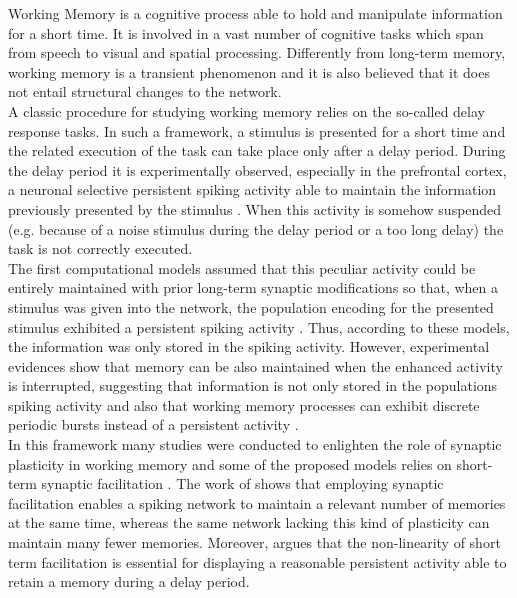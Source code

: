 \documentclass[a4paper, 12pt, twoside, openright]{book}
\begin{document}
Working Memory is a cognitive process able to hold and manipulate information for a short time. It is involved in a vast number of cognitive tasks \cite{Miller1960, baddeley_hitch1974, Cowan1998, Golosio2015} which span from speech to visual and spatial processing. Differently from long-term memory, working memory is a transient phenomenon and it is also believed that it does not entail structural changes to the network.\\
A classic procedure for studying working memory relies on the so-called delay response tasks. In such a framework, a stimulus is presented for a short time and the related execution of the task can take place only after a delay period. During the delay period it is experimentally observed, especially in the prefrontal cortex, a neuronal selective persistent spiking activity able to maintain the information previously presented by the stimulus \cite{Funahashi1989, GoldmanRakic1995, DEsposito2015}. When this activity is somehow suspended (e.g. because of a noise stimulus during the delay period or a too long delay) the task is not correctly executed.\\
The first computational models assumed that this peculiar activity could be entirely maintained with prior long-term synaptic modifications so that, when a stimulus was given into the network, the population encoding for the presented stimulus exhibited a persistent spiking activity \cite{hebb-organization-of-behavior-1949, Hopfield1982}. Thus, according to these models, the information was only stored in the spiking activity. However, experimental evidences show that memory can be also maintained when the enhanced activity is interrupted, suggesting that information is not only stored in the populations spiking activity \cite{Stokes2015} and also that working memory processes can exhibit discrete periodic bursts instead of a persistent activity \cite{Honkanen2014, Lundqvist2016}.\\
In this framework many studies were conducted to enlighten the role of synaptic plasticity in working memory \cite{Barak2014} and some of the proposed models relies on short-term synaptic facilitation \cite{barak_tsodyks2007,Mongillo2008,Rolls2013,Hansel2013}. The work of \cite{Rolls2013} shows that employing synaptic facilitation enables a spiking network to maintain a relevant number of memories at the same time, whereas the same network lacking this kind of plasticity can maintain many fewer memories. Moreover, \cite{Hansel2013} argues that the non-linearity of short term facilitation is essential for displaying a reasonable persistent activity able to retain a memory during a delay period. \\
\end{document}
